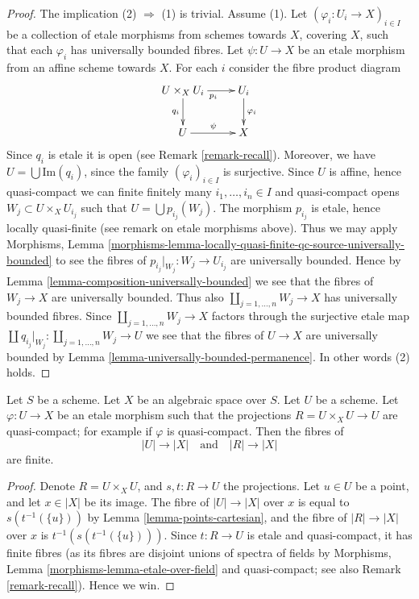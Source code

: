 \begin{proof}
The implication (2) $\Rightarrow$ (1) is trivial.
Assume (1). Let $(\varphi_i : U_i \to X)_{i \in I}$ be a collection of
etale morphisms from schemes towards $X$, covering $X$, such that
each $\varphi_i$ has universally bounded fibres.
Let $\psi : U \to X$ be an etale morphism from an affine scheme towards $X$.
For each $i$ consider the fibre product diagram
$$
\xymatrix{
U \times_X U_i \ar[r]_{p_i} \ar[d]_{q_i} & U_i \ar[d]^{\varphi_i} \\
U \ar[r]^\psi & X
}
$$
Since $q_i$ is etale it is open (see Remark \ref{remark-recall}).
Moreover, we have $U = \bigcup \text{Im}(q_i)$, since the family
$(\varphi_i)_{i \in I}$ is surjective. Since $U$ is affine, hence quasi-compact
we can finite finitely many $i_1, \ldots, i_n \in I$ and quasi-compact
opens $W_j \subset U \times_X U_{i_j}$ such that
$U = \bigcup p_{i_j}(W_j)$.
The morphism $p_{i_j}$ is etale, hence locally quasi-finite
(see remark on etale morphisms above). Thus we may apply
Morphisms, Lemma
\ref{morphisms-lemma-locally-quasi-finite-qc-source-universally-bounded}
to see the fibres of $p_{i_j}|_{W_j} : W_j \to U_{i_j}$ are universally
bounded. Hence by
Lemma \ref{lemma-composition-universally-bounded}
we see that the fibres of $W_j \to X$ are universally bounded.
Thus also $\coprod_{j = 1, \ldots, n} W_j \to X$ has universally
bounded fibres. Since $\coprod_{j = 1, \ldots, n} W_j \to X$ factors
through the surjective etale map
$\coprod q_{i_j}|_{W_j} : \coprod_{j = 1, \ldots, n} W_j \to U$ we
see that the fibres of $U \to X$ are universally bounded by
Lemma \ref{lemma-universally-bounded-permanence}.
In other words (2) holds.
\end{proof}

\begin{lemma}
\label{lemma-finite-fibres-presentation}
Let $S$ be a scheme.
Let $X$ be an algebraic space over $S$.
Let $U$ be a scheme. Let $\varphi : U \to X$ be an etale morphism such that the
projections $R = U \times_X U \to U$ are quasi-compact; for example if
$\varphi$ is quasi-compact. Then the fibres of
$$
|U| \to |X|
\quad\text{and}\quad
|R| \to |X|
$$
are finite.
\end{lemma}

\begin{proof}
Denote $R = U \times_X U$, and $s, t : R \to U$ the projections.
Let $u \in U$ be a point, and let $x \in |X|$ be its image.
The fibre of $|U| \to |X|$ over $x$ is equal to
$s(t^{-1}(\{u\}))$ by Lemma \ref{lemma-points-cartesian}, and
the fibre of $|R| \to |X|$ over $x$ is $t^{-1}(s(t^{-1}(\{u\})))$.
Since $t : R \to U$ is etale and quasi-compact, it has finite fibres
(as its fibres are disjoint unions of spectra of fields by
Morphisms, Lemma \ref{morphisms-lemma-etale-over-field}
and quasi-compact; see also Remark \ref{remark-recall}). Hence we win.
\end{proof}

